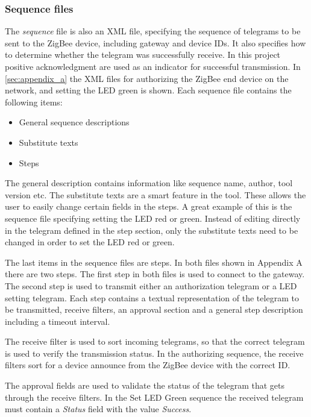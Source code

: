 \documentclass[Main]{subfiles}
\begin{document}
		\subsubsection{Sequence files}
			The \emph{sequence} file is also an XML file, specifying the sequence of telegrams to be sent to the ZigBee device, including gateway and device IDs. 
			It also specifies how to determine whether the telegram was successfully receive. 
			In this project positive acknowledgment are used as an indicator for successful transmission.
			In \ref{sec:appendix_a} the XML files for authorizing the ZigBee end device on the network, and setting the LED green is shown.
			Each sequence file contains the following items: 
			\begin{itemize}
				\item General sequence descriptions
				\item Substitute texts
				\item Steps
			\end{itemize}
			The general description contains information like sequence name, author, tool version etc.
			The substitute texts are a smart feature in the tool. 
			These allows the user to easily change certain fields in the steps. 
			A great example of this is the sequence file specifying setting the LED red or green.
			Instead of editing directly in the telegram defined in the step section, only the substitute texts need to be changed in order to set the LED red or green. 

			The last items in the sequence files are steps. 
			In both files shown in Appendix A there are two steps. 
			The first step in both files is used to connect to the gateway.
			The second step is used to transmit either an authorization telegram or a LED setting telegram.
			Each step contains a textual representation of the telegram to be transmitted, receive filters, an approval section and a general step description including a timeout interval.

			The receive filter is used to sort incoming telegrams, so that the correct telegram is used to verify the transmission status. 
			In the authorizing sequence, the receive filters sort for a device announce from the ZigBee device with the correct ID.
			
			The approval fields are used to validate the status of the telegram that gets through the receive filters. 
			In the Set LED Green sequence the received telegram must contain a \emph{Status} field with the value \emph{Success}.
\end{document}

